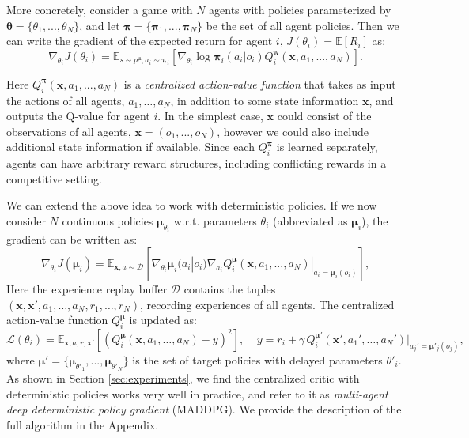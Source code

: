 \documentclass{article}
\newcommand{\pol}[0]{\pmb{\pi}}
\newcommand{\cpol}[0]{\pmb{\mu}}
\begin{document}
More concretely, consider a game with $N$ agents with policies parameterized by $\pmb{\theta} = \{\theta_1, ..., \theta_N\}$, and let $\pol = \{\pol_1, ..., \pol_N\}$ be the set of all agent policies. Then we can write the gradient of the expected return for agent $i$, $J(\theta_i) = \mathbb{E}[R_i]$ as:
\begin{equation}
\nabla_{\theta_i} J(\theta_i) = \mathbb{E}_{s\sim p^{\cpol},a_i \sim \pol_i} [\nabla_{\theta_i} \log \pol_i(a_i|o_i) Q^{\pol}_i (\mathbf{x},a_1, ..., a_N)]. 
\end{equation}

Here $Q^{\pol}_i (\mathbf{x},a_1, ..., a_N)$ is a \textit{centralized action-value function} that takes as input the actions of all agents, $a_1,\ldots, a_N$, in addition to some state information $\mathbf{x}$, and outputs the Q-value for agent $i$. In the simplest case, $\mathbf{x}$ could consist of the observations of all agents, $\mathbf{x} = (o_1, ..., o_N)$, however we could also include additional state information if available. Since each $Q^{\pol}_i$ is learned separately, agents can have arbitrary reward structures, including conflicting rewards in a competitive setting.

We can extend the above idea to work with deterministic policies. If we now consider $N$ continuous policies $\cpol_{\theta_i}$ w.r.t. parameters $\theta_i$ (abbreviated as $\cpol_i$), the gradient can be written as:
\begin{equation}
\nabla_{\theta_i} J(\cpol_i) = \mathbb{E}_{\mathbf{x},a \sim \mathcal{D}}[\nabla_{\theta_i} \cpol_i(a_i|o_i) \nabla_{a_i} Q^{\cpol}_i (\mathbf{x},a_1, ..., a_N)|_{a_i=\cpol_i (o_i)}],
\end{equation}
Here the experience replay buffer $\mathcal{D}$ contains the tuples $(\mathbf{x},\mathbf{x}',a_1,\ldots,a_N,r_1,\ldots,r_N)$, recording experiences of all agents. 
The centralized action-value function $Q^{\cpol}_i$ is updated as:
\begin{equation}\label{eq:q_func}
\mathcal{L}(\theta_i) = \mathbb{E}_{\mathbf{x},a,r,\mathbf{x}'}[(Q^{\cpol}_i(\mathbf{x},a_1,\ldots,a_N) - y)^2], \;\;\;\;
y = r_i + \gamma\, Q^{\cpol'}_i(\mathbf{x}', a_1',\ldots,a_N')\big|_{a_j'=\cpol'_j(o_j)},
\end{equation}
where $\cpol' = \{\cpol_{\theta'_1}, ..., \cpol_{\theta'_N} \}$ is the set of target policies with delayed parameters $\theta'_i$. As shown in Section \ref{sec:experiments}, we find the centralized critic with deterministic policies works very well in practice, and refer to it as \textit{multi-agent deep deterministic policy gradient} (MADDPG). 
We provide the description of the full algorithm in the Appendix. 
\end{document}

